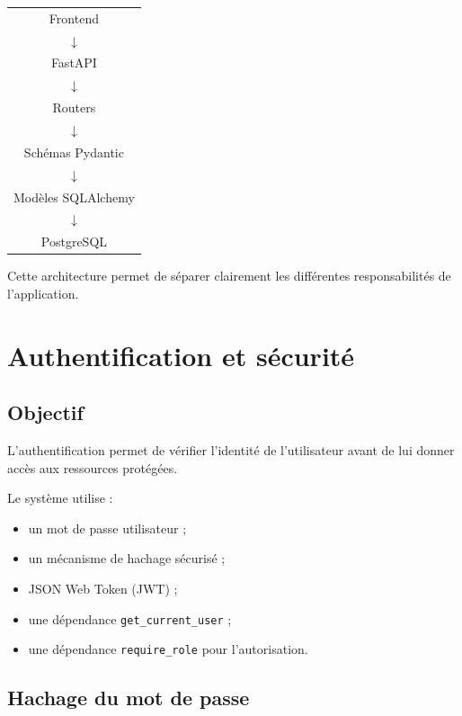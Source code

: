 \documentclass[12pt,a4paper]{report}
\begin{document}
\begin{center}

\begin{tabular}{c}
Frontend \\[0.2cm]
$\downarrow$ \\[0.2cm]
FastAPI \\[0.2cm]
$\downarrow$ \\[0.2cm]
Routers \\[0.2cm]
$\downarrow$ \\[0.2cm]
Schémas Pydantic \\[0.2cm]
$\downarrow$ \\[0.2cm]
Modèles SQLAlchemy \\[0.2cm]
$\downarrow$ \\[0.2cm]
PostgreSQL
\end{tabular}

\end{center}

Cette architecture permet de séparer clairement les différentes
responsabilités de l'application.



\chapter{Authentification et sécurité}

\section{Objectif}

L'authentification permet de vérifier l'identité de l'utilisateur avant
de lui donner accès aux ressources protégées.

Le système utilise :

\begin{itemize}
    \item un mot de passe utilisateur ;
    \item un mécanisme de hachage sécurisé ;
    \item JSON Web Token (JWT) ;
    \item une dépendance \texttt{get\_current\_user} ;
    \item une dépendance \texttt{require\_role} pour l'autorisation.
\end{itemize}

\section{Hachage du mot de passe}
\end{document}
